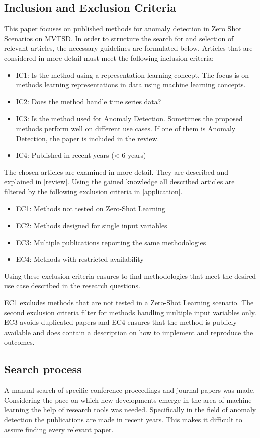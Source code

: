 \subsection{Inclusion and Exclusion Criteria}\label{criteria}
This paper focuses on published methods for anomaly detection in Zero Shot Scenarios on MVTSD. In order to structure the search for and selection of relevant articles, the necessary guidelines are formulated below. Articles that are considered in more detail must meet the following inclusion criteria:
\begin{itemize}
\item IC1: Is the method using a representation learning concept. The focus is on methods learning representations in data using machine learning concepts.
\item IC2: Does the method handle time series data?
\item IC3: Is the method used for Anomaly Detection. Sometimes the proposed methods perform well on different use cases. If one of them is Anomaly Detection, the paper is included in the review.
\item IC4: Published in recent years (< 6 years)
\end{itemize}
The chosen articles are examined in more detail. They are described and explained in \ref{review}. Using the gained knowledge all described articles are filtered by the following exclusion criteria in \ref{application}.
\begin{itemize}
\item EC1: Methods not tested on Zero-Shot Learning
\item EC2: Methods designed for single input variables
\item EC3: Multiple publications reporting the same methodologies
\item EC4: Methods with restricted availability
\end{itemize}
Using these exclusion criteria ensures to find methodologies that meet the desired use case described in the research questions.

EC1 excludes methods that are not tested in a Zero-Shot Learning scenario. The second exclusion criteria filter for methods handling multiple input variables only. EC3 avoids duplicated papers and EC4 ensures that the method is publicly available and does contain a description on how to implement and reproduce the outcomes.
\subsection{Search process}
A manual search of specific conference proceedings and journal papers was made. Considering the pace on which new developments emerge in the area of machine learning the help of research tools was needed. Specifically in the field of anomaly detection the publications are made in recent years. This makes it difficult to assure finding every relevant paper.

